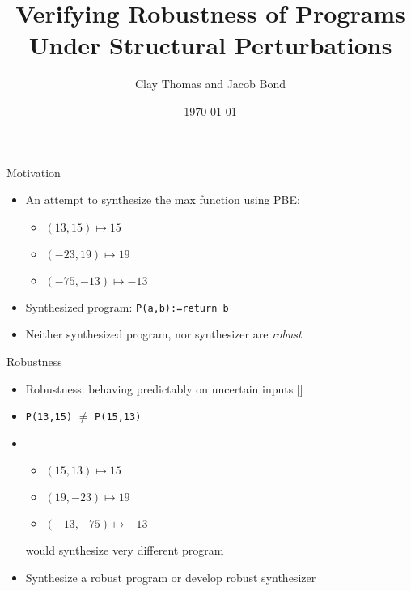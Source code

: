 \documentclass[usenames,dvipsnames]{beamer}
\title{Verifying Robustness of Programs Under Structural Perturbations}
\author{Clay Thomas and Jacob Bond}
\date{\today}
\begin{document}

\begin{frame}
  \titlepage
\end{frame}

\begin{frame}[fragile]{Motivation}
    \begin{itemize}
        \item<1-> An attempt to synthesize the max function using PBE:
            \begin{itemize}
                \item \((13, 15) \mapsto 15\)
                \item \((-23, 19) \mapsto 19\)
                \item \((-75, -13) \mapsto -13\)
            \end{itemize}
        \item<2-> Synthesized program: \verb!P(a,b):=return b!
        \item<3-> Neither synthesized program, nor synthesizer are {\it robust}
    \end{itemize}
\end{frame}

\begin{frame}[fragile]{Robustness}
    \begin{itemize}
        \item<1-> Robustness: behaving predictably on uncertain inputs [\cite{chaudhuri12}]
        \item<2-> \verb!P(13,15)! \(\not=\) \verb!P(15,13)!
        \item<3-> 
            \begin{itemize}
                \item \((15, 13) \mapsto 15\)
                \item \((19, -23) \mapsto 19\)
                \item \((-13, -75) \mapsto -13\)
            \end{itemize}
            would synthesize very different program
        \item<4-> Synthesize a robust program or develop robust synthesizer
    \end{itemize}
\end{frame}
\end{document}
